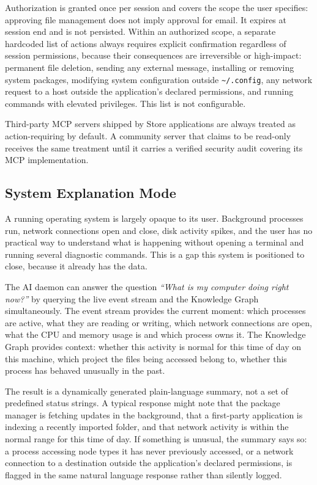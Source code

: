 Authorization is granted once per session and covers the scope the user
specifies: approving file management does not imply approval for email. It
expires at session end and is not persisted. Within an authorized scope, a
separate hardcoded list of actions always requires explicit confirmation
regardless of session permissions, because their consequences are irreversible
or high-impact: permanent file deletion, sending any external message,
installing or removing system packages, modifying system configuration outside
\texttt{\textasciitilde/.config}, any network request to a host outside the
application's declared permissions, and running commands with elevated
privileges. This list is not configurable.

Third-party MCP servers shipped by Store applications are always treated as
action-requiring by default. A community server that claims to be read-only
receives the same treatment until it carries a verified security audit covering
its MCP implementation.

\subsection{System Explanation Mode}
\label{sec:ai-explain}

A running operating system is largely opaque to its user. Background processes
run, network connections open and close, disk activity spikes, and the user
has no practical way to understand what is happening without opening a terminal
and running several diagnostic commands. This is a gap this system is
positioned to close, because it already has the data.

The AI daemon can answer the question \emph{``What is my computer doing right
now?''} by querying the live event stream and the Knowledge Graph simultaneously.
The event stream provides the current moment: which processes are active, what
they are reading or writing, which network connections are open, what the CPU
and memory usage is and which process owns it. The Knowledge Graph provides
context: whether this activity is normal for this time of day on this machine,
which project the files being accessed belong to, whether this process has
behaved unusually in the past.

The result is a dynamically generated plain-language summary, not a set of
predefined status strings. A typical response might note that the package
manager is fetching updates in the background, that a first-party application
is indexing a recently imported folder, and that network activity is within the
normal range for this time of day. If something is unusual, the summary says
so: a process accessing node types it has never previously accessed, or a
network connection to a destination outside the application's declared
permissions, is flagged in the same natural language response rather than
silently logged.

